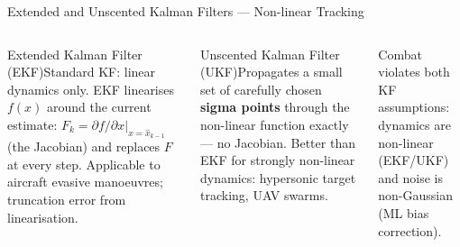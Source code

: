 \documentclass[aspectratio=169,10pt,t]{beamer}
\begin{document}
\begin{frame}{Extended and Unscented Kalman Filters --- Non-linear Tracking}
\begin{columns}[T]
\begin{cbox}[ISSAred]{Extended Kalman Filter (EKF)}\scriptsize Standard KF: linear dynamics only. EKF linearises $f(x)$ around the current estimate: $F_k=\partial f/\partial x\big|_{x=\hat x_{k-1}}$ (the Jacobian) and replaces $F$ at every step. Applicable to aircraft evasive manoeuvres; truncation error from linearisation.\end{cbox}
\begin{cbox}[ISSAgrn]{Unscented Kalman Filter (UKF)}\scriptsize Propagates a small set of carefully chosen \textbf{sigma points} through the non-linear function exactly --- no Jacobian. Better than EKF for strongly non-linear dynamics: hypersonic target tracking, UAV swarms.\end{cbox}
\begin{ibox}\scriptsize Combat violates both KF assumptions: dynamics are non-linear (EKF/UKF) and noise is non-Gaussian (ML bias correction).\end{ibox}
\end{columns}
\end{frame}
\end{document}
